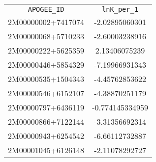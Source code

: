 \begin{table}
\begin{tabular}{cc}
\texttt{APOGEE\_ID} & \texttt{lnK\_per\_1} \\
2M00000002+7417074 & -2.02895060301 \\
2M00000068+5710233 & -2.60003238916 \\
2M00000222+5625359 & 2.13406075239 \\
2M00000446+5854329 & -7.19966931343 \\
2M00000535+1504343 & -4.45762853622 \\
2M00000546+6152107 & -4.38870251179 \\
2M00000797+6436119 & -0.774145334959 \\
2M00000866+7122144 & -3.31356692314 \\
2M00000943+6254542 & -6.66112732887 \\
2M00001045+6126148 & -2.11078292727 \\
\end{tabular}
\end{table}
